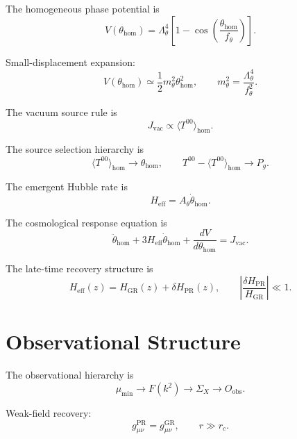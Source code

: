 \documentclass[11pt]{article}
\newcommand{\PR}{\mathrm{PR}}
\newcommand{\eff}{\mathrm{eff}}
\newcommand{\GR}{\mathrm{GR}}
\newcommand{\obs}{\mathrm{obs}}
\newcommand{\vac}{\mathrm{vac}}
\newcommand{\hom}{\mathrm{hom}}
\begin{document}
The homogeneous phase potential is
\begin{equation}
V(\theta_{\hom})
=
\Lambda_\theta^4
\left[
1-\cos\left(
\frac{\theta_{\hom}}{f_\theta}
\right)
\right].
\end{equation}

Small-displacement expansion:
\begin{equation}
V(\theta_{\hom})
\simeq
\frac12m_\theta^2\theta_{\hom}^2,
\qquad
m_\theta^2=\frac{\Lambda_\theta^4}{f_\theta^2}.
\end{equation}

The vacuum source rule is
\begin{equation}
J_{\vac}\propto\langle T^{00}\rangle_{\hom}.
\end{equation}

The source selection hierarchy is
\begin{equation}
\boxed{
\langle T^{00}\rangle_{\hom}\rightarrow\theta_{\hom},
\qquad
T^{00}-\langle T^{00}\rangle_{\hom}\rightarrow P_g.
}
\end{equation}

The emergent Hubble rate is
\begin{equation}
\boxed{
H_{\eff}=A_\theta\dot\theta_{\hom}.
}
\end{equation}

The cosmological response equation is
\begin{equation}
\boxed{
\ddot\theta_{\hom}
+
3H_{\eff}\dot\theta_{\hom}
+
\frac{dV}{d\theta_{\hom}}
=
J_{\vac}.
}
\end{equation}

The late-time recovery structure is
\begin{equation}
H_{\eff}(z)=H_{\GR}(z)+\delta H_{\PR}(z),
\qquad
\left|
\frac{\delta H_{\PR}}{H_{\GR}}
\right|\ll1.
\end{equation}


\section{Observational Structure}

The observational hierarchy is
\begin{equation}
\boxed{
\mu_{\min}
\rightarrow
F(k^2)
\rightarrow
\Sigma_X
\rightarrow
O_{\obs}.
}
\end{equation}

Weak-field recovery:
\begin{equation}
g_{\mu\nu}^{\PR}=g_{\mu\nu}^{\GR},
\qquad
r\gg r_c.
\end{equation}
\end{document}

